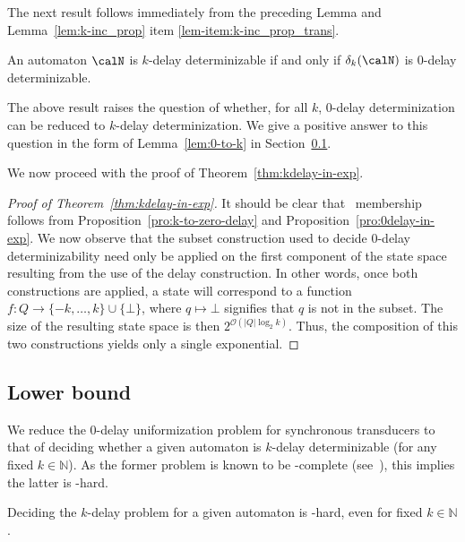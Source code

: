 \documentclass[a4paper]{article}
\begin{document}
The next result follows immediately from the preceding Lemma and
Lemma~\ref{lem:k-inc_prop} item \ref{lem-item:k-inc_prop_trans}.

\begin{proposition}\label{pro:k-to-zero-delay}
	An automaton $\calN$ is $k$-delay determinizable if and only if
	$\delta_k(\calN)$ is $0$-delay determinizable.
\end{proposition}

The above result raises the question of whether, for all $k$, $0$-delay
determinization can be reduced to $k$-delay determinization. We give a positive
answer to this question in the form of Lemma~\ref{lem:0-to-k} in
Section~\ref{sec:lower-bound-delay}. 

We now proceed with the proof of Theorem~\ref{thm:kdelay-in-exp}.

\begin{proof}[Proof of Theorem~\ref{thm:kdelay-in-exp}]
	It should be clear that \TWOEXP~membership follows from
	Proposition~\ref{pro:k-to-zero-delay} and
	Proposition~\ref{pro:0delay-in-exp}. We now observe that the subset
	construction used to decide $0$-delay determinizability need only be
	applied on the first component of the state space resulting from the use
	of the delay construction. In other words, once both constructions are
	applied, a state will correspond to a function $f : Q \to \{-k, \dots,
	k\} \cup \{\bot\}$, where $q \mapsto \bot$ signifies that $q$ is not in
	the subset. The size of the resulting state space is then
	$2^{\mathcal{O}(|Q| \log_2k)}$.  Thus, the composition of this two
	constructions yields only a single exponential.
\end{proof}

\subsection{Lower bound}\label{sec:lower-bound-delay}
We reduce the $0$-delay uniformization problem for synchronous transducers to
that of deciding whether a given automaton is $k$-delay determinizable (for any
fixed $k \in \mathbb{N}$). As the former problem is known to be \EXP-complete
(see~\cite{fjlw16}), this implies the latter is \EXP-hard.

\begin{theorem}\label{thm:kdelay-exp-hard}
	Deciding the $k$-delay problem for a given automaton is
	\EXP-hard, even for fixed $k \in \mathbb{N}$.
\end{theorem}
\end{document}
